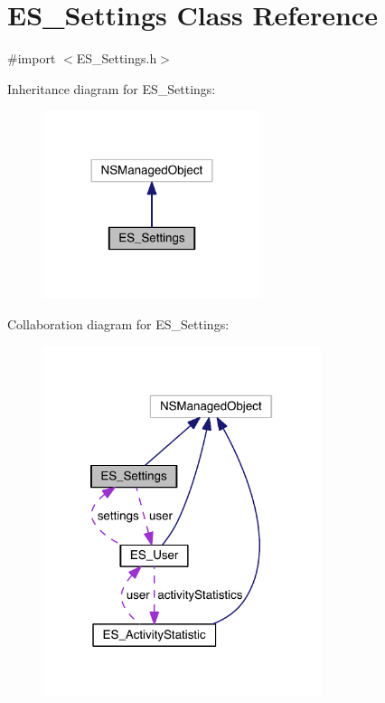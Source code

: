 \hypertarget{interface_e_s___settings}{\section{E\+S\+\_\+\+Settings Class Reference}
\label{interface_e_s___settings}
}


{\ttfamily \#import $<$E\+S\+\_\+\+Settings.\+h$>$}



Inheritance diagram for E\+S\+\_\+\+Settings\+:\nopagebreak
\begin{figure}[H]
\begin{center}
\leavevmode
\includegraphics[width=180pt]{de/d36/interface_e_s___settings__inherit__graph}
\end{center}
\end{figure}


Collaboration diagram for E\+S\+\_\+\+Settings\+:\nopagebreak
\begin{figure}[H]
\begin{center}
\leavevmode
\includegraphics[width=230pt]{df/d2d/interface_e_s___settings__coll__graph}
\end{center}
\end{figure}
